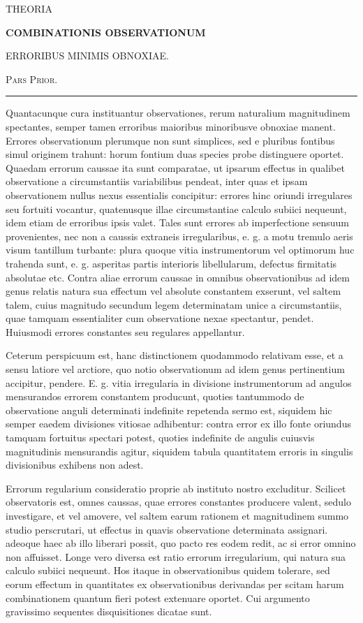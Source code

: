 \begin{center}
{\large THEORIA\par}
\medskip
{\Large\bfseries COMBINATIONIS OBSERVATIONUM\par}
\medskip
{\large ERRORIBUS MINIMIS OBNOXIAE.\par}
\medskip
{\large\textsc{Pars Prior.}\par}
\medskip
\rule{.22\linewidth}{.3pt}
\end{center}
Quantacunque cura instituantur observationes, rerum naturalium magnitudinem spectantes, semper tamen erroribus maioribus minoribusve obnoxiae manent. Errores observationum plerumque non sunt simplices, sed e pluribus fontibus simul originem trahunt: horum fontium duas species probe distinguere oportet. Quaedam errorum caussae ita sunt comparatae, ut ipsarum effectus in qualibet observatione a circumstantiis variabilibus pendeat, inter quas et ipsam observationem nullus nexus essentialis concipitur: errores hinc oriundi irregulares seu fortuiti vocantur, quatenusque illae circumstantiae calculo subiici nequeunt, idem etiam de erroribus ipsis valet. Tales sunt errores ab imperfectione sensuum provenientes, nec non a caussis extraneis irregularibus, e. g. a motu tremulo aeris visum tantillum turbante: plura quoque vitia instrumentorum vel optimorum huc trahenda sunt, e. g. asperitas partis interioris libellularum, defectus firmitatis absolutae etc. Contra aliae errorum caussae in omnibus observationibus ad idem genus relatis natura sua effectum vel absolute constantem exserunt, vel saltem talem, cuius magnitudo secundum legem determinatam unice a circumstantiis, quae tamquam essentialiter cum observatione nexae spectantur, pendet. Huiusmodi errores constantes seu regulares appellantur.

Ceterum perspicuum est, hanc distinctionem quodammodo relativam esse, et a sensu latiore vel arctiore, quo notio observationum ad idem genus pertinentium accipitur, pendere. E. g. vitia irregularia in divisione instrumentorum ad angulos mensurandos errorem constantem producunt, quoties tantummodo de observatione anguli determinati indefinite repetenda sermo est, siquidem hic semper eaedem divisiones vitiosae adhibentur: contra error ex illo fonte oriundus tamquam fortuitus spectari potest, quoties indefinite de angulis cuiusvis magnitudinis mensurandis agitur, siquidem tabula quantitatem erroris in singulis divisionibus exhibens non adest.

Errorum regularium consideratio proprie ab instituto nostro excluditur. Scilicet observatoris est, omnes caussas, quae errores constantes producere valent, sedulo investigare, et vel amovere, vel saltem earum rationem et magnitudinem summo studio perscrutari, ut effectus in quavis observatione determinata assignari. adeoque haec ab illo liberari possit, quo pacto res eodem redit, ac si error omnino non affuisset. Longe vero diversa est ratio errorum irregularium, qui natura sua calculo subiici nequeunt. Hos itaque in observationibus quidem tolerare, sed eorum effectum in quantitates ex observationibus derivandas per scitam harum combinationem quantum fieri potest extenuare oportet. Cui argumento gravissimo sequentes disquisitiones dicatae sunt.

